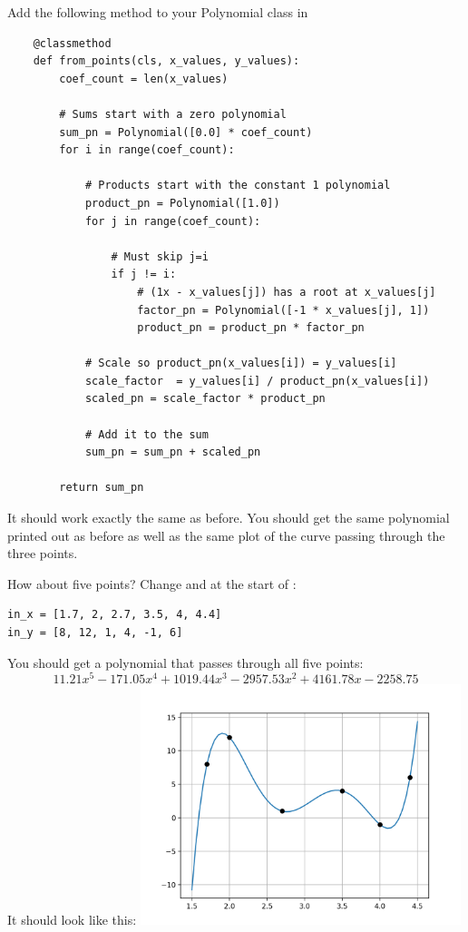 Add the following method to your Polynomial class in 
\begin{Verbatim}
    @classmethod
    def from_points(cls, x_values, y_values):
        coef_count = len(x_values)

        # Sums start with a zero polynomial
        sum_pn = Polynomial([0.0] * coef_count)
        for i in range(coef_count):

            # Products start with the constant 1 polynomial
            product_pn = Polynomial([1.0])
            for j in range(coef_count):

                # Must skip j=i
                if j != i:
                    # (1x - x_values[j]) has a root at x_values[j]
                    factor_pn = Polynomial([-1 * x_values[j], 1])
                    product_pn = product_pn * factor_pn
                    
            # Scale so product_pn(x_values[i]) = y_values[i]
            scale_factor  = y_values[i] / product_pn(x_values[i])
            scaled_pn = scale_factor * product_pn

            # Add it to the sum
            sum_pn = sum_pn + scaled_pn
            
        return sum_pn  
\end{Verbatim}

It should work exactly the same as before.  You should get the same
polynomial printed out as before as well as the same plot of the
curve passing through the three points.

How about five points? Change  and  at the
start of :
\begin{Verbatim}
in_x = [1.7, 2, 2.7, 3.5, 4, 4.4]
in_y = [8, 12, 1, 4, -1, 6]
\end{Verbatim}

You should get a polynomial that passes through all five points:
\begin{equation*}
11.21x^5 - 171.05x^4 + 1019.44x^3 - 2957.53x^2 + 4161.78x - 2258.75  
\end{equation*}
It should look like this:
\includegraphics[width=0.7\textwidth]{fiveinterp.png}

